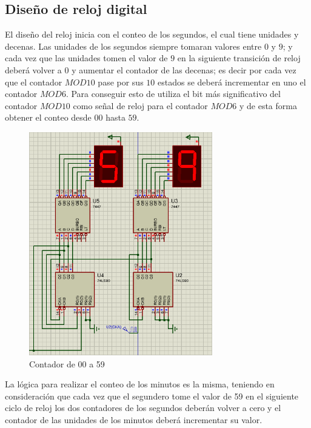 \subsection{Diseño de reloj digital}
El diseño del reloj inicia con el conteo de los segundos, el cual tiene unidades y decenas. Las unidades de los segundos siempre tomaran valores entre $0$ y $9$; y cada vez que las unidades  tomen  el  valor  de  $9$  en  la  siguiente  transición  de  reloj  deberá  volver  a  $0$  y aumentar el contador de las decenas; es decir por cada vez que el contador $MOD10$ pase por sus $10$ estados se deberá incrementar en uno el contador $MOD6$.  
\newline
Para conseguir esto de utiliza el bit más significativo del contador $MOD10$ como señal de reloj para el contador $MOD6$ y de esta forma obtener el conteo desde $00$ hasta $59$.
\newline 
\begin{figure}[h]
    \begin{center}
    \includegraphics[width=8cm]{images/image6.png}
    \newline
    \caption{Contador de 00 a 59}\label{cont_59}
    \end{center}
\end{figure}
\newline
La lógica para realizar el conteo de los minutos es la misma, teniendo en consideración que cada vez que el segundero tome el valor de 59 en el siguiente ciclo de reloj los dos contadores de  los  segundos  deberán  volver  a  cero  y  el  contador  de  las  unidades de  los minutos deberá incrementar su valor.
\newline
